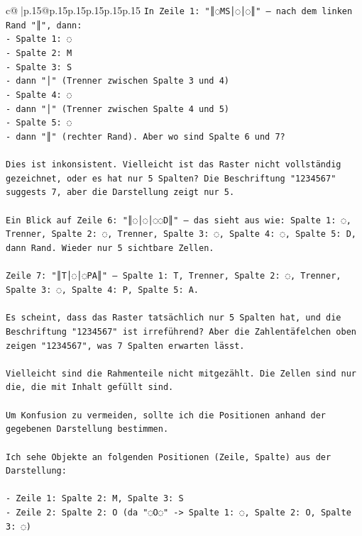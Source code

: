 \documentclass{article}
\begin{document}
{\begin{supertabular}{c@{$\;$}|p{.15\linewidth}@{}p{.15\linewidth}p{.15\linewidth}p{.15\linewidth}p{.15\linewidth}p{.15\linewidth}}
{{{\texttt{In Zeile 1: "║◌MS│◌│◌║" – nach dem linken Rand "║", dann:} \\
\texttt{{-} Spalte 1: ◌} \\
\texttt{{-} Spalte 2: M} \\
\texttt{{-} Spalte 3: S} \\
\texttt{{-} dann "│" (Trenner zwischen Spalte 3 und 4)} \\
\texttt{{-} Spalte 4: ◌} \\
\texttt{{-} dann "│" (Trenner zwischen Spalte 4 und 5)} \\
\texttt{{-} Spalte 5: ◌} \\
\texttt{{-} dann "║" (rechter Rand). Aber wo sind Spalte 6 und 7?} \\
\\ 
\texttt{Dies ist inkonsistent. Vielleicht ist das Raster nicht vollständig gezeichnet, oder es hat nur 5 Spalten? Die Beschriftung "1234567" suggests 7, aber die Darstellung zeigt nur 5.} \\
\\ 
\texttt{Ein Blick auf Zeile 6: "║◌│◌│◌◌D║" – das sieht aus wie: Spalte 1: ◌, Trenner, Spalte 2: ◌, Trenner, Spalte 3: ◌, Spalte 4: ◌, Spalte 5: D, dann Rand. Wieder nur 5 sichtbare Zellen.} \\
\\ 
\texttt{Zeile 7: "║T│◌│◌PA║" – Spalte 1: T, Trenner, Spalte 2: ◌, Trenner, Spalte 3: ◌, Spalte 4: P, Spalte 5: A.} \\
\\ 
\texttt{Es scheint, dass das Raster tatsächlich nur 5 Spalten hat, und die Beschriftung "1234567" ist irreführend? Aber die Zahlentäfelchen oben zeigen "1234567", was 7 Spalten erwarten lässt.} \\
\\ 
\texttt{Vielleicht sind die Rahmenteile nicht mitgezählt. Die Zellen sind nur die, die mit Inhalt gefüllt sind.} \\
\\ 
\texttt{Um Konfusion zu vermeiden, sollte ich die Positionen anhand der gegebenen Darstellung bestimmen.} \\
\\ 
\texttt{Ich sehe Objekte an folgenden Positionen (Zeile, Spalte) aus der Darstellung:} \\
\\ 
\texttt{{-} Zeile 1: Spalte 2: M, Spalte 3: S} \\
\texttt{{-} Zeile 2: Spalte 2: O (da "◌O◌" {-}> Spalte 1: ◌, Spalte 2: O, Spalte 3: ◌)} \\
}}}
\end{supertabular}}
\end{document}
